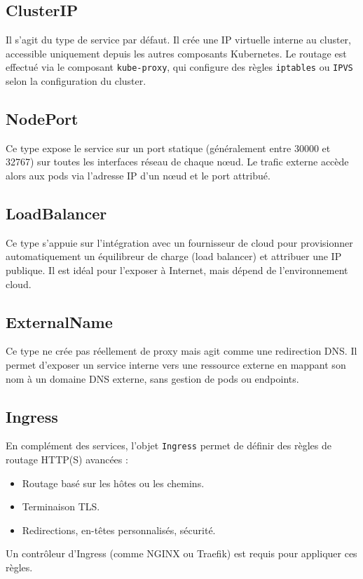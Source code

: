\subsection{ClusterIP}
Il s’agit du type de service par défaut. Il crée une IP virtuelle interne au cluster, accessible uniquement depuis les autres composants Kubernetes. Le routage est effectué via le composant \texttt{kube-proxy}, qui configure des règles \texttt{iptables} ou \texttt{IPVS} selon la configuration du cluster.

\subsection{NodePort}
Ce type expose le service sur un port statique (généralement entre 30000 et 32767) sur toutes les interfaces réseau de chaque nœud. Le trafic externe accède alors aux pods via l’adresse IP d’un nœud et le port attribué.

\subsection{LoadBalancer}
Ce type s’appuie sur l’intégration avec un fournisseur de cloud pour provisionner automatiquement un équilibreur de charge (load balancer) et attribuer une IP publique. Il est idéal pour l’exposer à Internet, mais dépend de l’environnement cloud.

\subsection{ExternalName}
Ce type ne crée pas réellement de proxy mais agit comme une redirection DNS. Il permet d’exposer un service interne vers une ressource externe en mappant son nom à un domaine DNS externe, sans gestion de pods ou endpoints.

\subsection{Ingress}
En complément des services, l’objet \texttt{Ingress} permet de définir des règles de routage HTTP(S) avancées :
\begin{itemize}
	\item Routage basé sur les hôtes ou les chemins.
	\item Terminaison TLS.
	\item Redirections, en-têtes personnalisés, sécurité.
\end{itemize}
Un contrôleur d’Ingress (comme NGINX ou Traefik) est requis pour appliquer ces règles.

